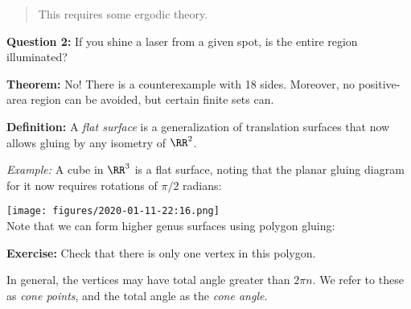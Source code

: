 \begin{quote}
This requires some ergodic theory.
\end{quote}

\textbf{Question 2:} If you shine a laser from a given spot, is the
entire region illuminated?

\textbf{Theorem:} No! There is a counterexample with 18 sides. Moreover,
no positive-area region can be avoided, but certain finite sets can.

\textbf{Definition:} A \emph{flat surface} is a generalization of
translation surfaces that now allows gluing by any isometry of
\(\RR^2\).

\emph{Example:} A cube in \(\RR^3\) is a flat surface, noting that the
planar gluing diagram for it now requires rotations of \(\pi/2\)
radians:

\texttt{[image: figures/2020-01-11-22:16.png]}\\

Note that we can form higher genus surfaces using polygon gluing:

\begin{center}
\end{center}

\textbf{Exercise:} Check that there is only one vertex in this polygon.

In general, the vertices may have total angle greater than \(2\pi n\).
We refer to these as \emph{cone points}, and the total angle as the
\emph{cone angle}.

